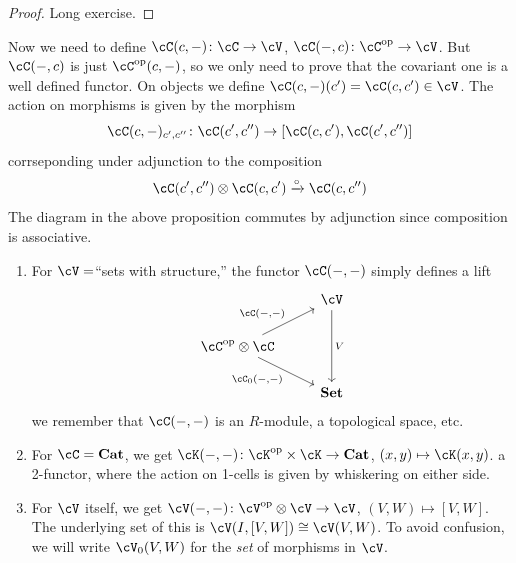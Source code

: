\documentclass[a4paper,11pt,oneside,openany]{scrbook}
\begin{document}
\begin{proof}
    Long exercise.
\end{proof}
Now we need to define $ \cC(c,-) \from \cC \to \cV $, $ \cC(-,c)\from \cC^{\op}\to \cV $.
But $ \cC(-,c) $ is just $ \cC^{\op}(c,-) $, so we only need to prove that the covariant one is a well defined functor.
On objects we define $ \cC(c,-)(c') = \cC(c,c') \in \cV $.
The action on morphisms is given by the morphism
\begin{displaymath}
    \cC(c,-)_{c',c''} \from \cC(c',c'') \to [\cC(c,c'),\cC(c',c'')]
\end{displaymath}
corrseponding under adjunction to the composition
\begin{displaymath}
    \cC(c',c'')\otimes \cC(c,c') \xrightarrow{\circ} \cC(c,c'')
\end{displaymath}
The diagram in the above proposition commutes by adjunction since composition is associative.
\begin{exmp}
    \begin{enumerate}[label=\arabic*)]
	\item
	    For $ \cV =  $``sets with structure,'' the functor $ \cC(-,-) $ simply defines a lift 
	    \begin{displaymath}
	        \begin{tikzcd}
	    	& \cV \arrow[dd, "V"]\\
	    	\cC^{\op}\otimes \cC \arrow[ur, "{\cC(-,-)}"]\arrow[dr, "{\cC_0(-,-)}"'] & \\
	    	& \Set
	        \end{tikzcd}
	    \end{displaymath}
	    we remember that $ \cC(-,-) $ is an $ R $-module, a topological space, etc.
	\item
	    For $ \cC = \Cat $, we get $ \cK(-,-) \from \cK^{\op}\times \cK \to \Cat $, $ (x,y)\mapsto \cK(x,y) $.
	    a 2-functor, where the action on 1-cells is given by whiskering on either side.
	\item
	    For $ \cV $ itself, we get  $ \cV(-,-) \from \cV^{\op}\otimes \cV \to \cV $, $ (V,W)\mapsto [V,W] $.
	    The underlying set of this is $ \cV(I,[V,W]) \iso \cV(V,W) $.
	    To avoid confusion, we will write $ \cV_0(V,W) $ for the \emph{set} of morphisms in $ \cV $.
    \end{enumerate}
\end{exmp}
\end{document}
